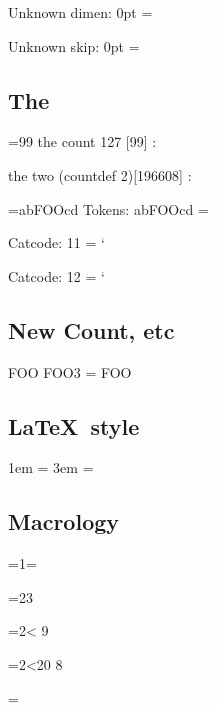\documentclass{article}
\begin{document}
Unknown dimen: 0pt = \the{}\relax

Unknown skip: 0pt = \the{}\relax

\subsection{The}
=99\relax
the count 127 [99] : \the{}\relax

the two (countdef 2)[196608] : \the\two


\def\foo{FOO}


={ab\foo cd}
Tokens: abFOOcd = \the{}

Catcode: 11 = \the\catcode`\A

Catcode: 12 = \the\catcode`\@


\subsection{New Count, etc}
\newcount\foo
\foo3 = \the\foo

\subsection{\LaTeX\ style}
\newlength{\foolen}
\setlength{\foolen}{1em}
1em = \the\foolen
\addtolength{\foolen}{2em}
3em = \the\foolen

\subsection{Macrology}
\def\numthree{3}
=1=\the{}

=2\numthree\relax
[23=\the\count2]

=2< 9\fi
[29=\the\count2]

=2\ifnum{}<20 8\fi
[29=\the\count2]

\makeatletter
\count\tw@=\@M\relax
[10000=\the\count\tw@]
[\chardef\mydollar=36\relax
\$a\$ = \mydollar a\mydollar]

\makeatother
\end{document}
